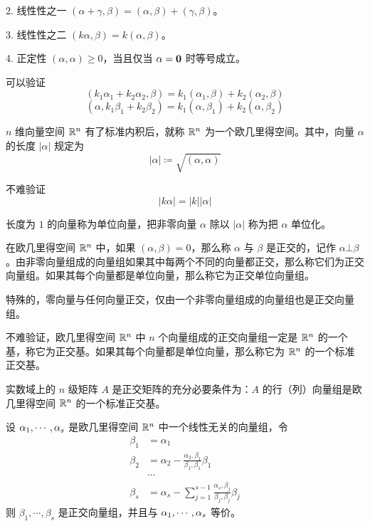 2. 线性性之一 $(\alpha+\gamma,\beta) = (\alpha,\beta) + (\gamma,\beta)$。

3. 线性性之二 $(k\alpha,\beta) = k(\alpha,\beta)$。

4. 正定性 $(\alpha,\alpha) \geqslant 0$，当且仅当 $\alpha=\boldsymbol{0}$ 时等号成立。

可以验证
\[(k_1\alpha_1+k_2\alpha_2, \beta) = k_1(\alpha_1,\beta) + k_2(\alpha_2,\beta)\]
\[(\alpha, k_1\beta_1+k_2\beta_2) = k_1(\alpha,\beta_1) + k_2(\alpha,\beta_2)\]

$n$ 维向量空间 $\mathbb{R}^n$ 有了标准内积后，就称 $\mathbb{R}^n$ 为一个欧几里得空间。其中，向量 $\alpha$ 的长度 $|\alpha|$ 规定为
\[|\alpha| \coloneqq  \sqrt{(\alpha,\alpha)}\]

不难验证
\[|k\alpha| = |k||\alpha|\]

长度为 $1$ 的向量称为单位向量，把非零向量 $\alpha$ 除以 $|\alpha|$ 称为把 $\alpha$ 单位化。

在欧几里得空间 $\mathbb{R}^n$ 中，如果 $(\alpha,\beta)=0$，那么称 $\alpha$ 与 $\beta$ 是正交的，记作 $\alpha \bot \beta$。由非零向量组成的向量组如果其中每两个不同的向量都正交，那么称它们为正交向量组。如果其每个向量都是单位向量，那么称它为正交单位向量组。

特殊的，零向量与任何向量正交，仅由一个非零向量组成的向量组也是正交向量组。

不难验证，欧几里得空间 $\mathbb{R}^n$ 中 $n$ 个向量组成的正交向量组一定是 $\mathbb{R}^n$ 的一个基，称它为正交基。如果其每个向量都是单位向量，那么称它为 $\mathbb{R}^n$ 的一个标准正交基。

\begin{theorem}
    实数域上的 $n$ 级矩阵 $A$ 是正交矩阵的充分必要条件为：$A$ 的行（列）向量组是欧几里得空间 $\mathbb{R}^n$ 的一个标准正交基。
\end{theorem}

\begin{theorem}
    设 $\alpha_1,\cdots,\alpha_s$ 是欧几里得空间 $\mathbb{R}^n$ 中一个线性无关的向量组，令
    \begin{equation*}
        \begin{aligned}
            \beta_1&=\alpha_1\\
            \beta_2&=\alpha_2 - \frac{\alpha_2,\beta_1}{\beta_1,\beta_1}\beta_1\\
            &\cdots \\
            \beta_s &= \alpha_s-\sum_{j=1}^{s-1}\frac{\alpha_s,\beta_j}{\beta_j,\beta_j}\beta_j
        \end{aligned}
    \end{equation*}
    则 $\beta_1,\cdots,\beta_s$ 是正交向量组，并且与 $\alpha_1,\cdots,\alpha_s$ 等价。
\end{theorem}

